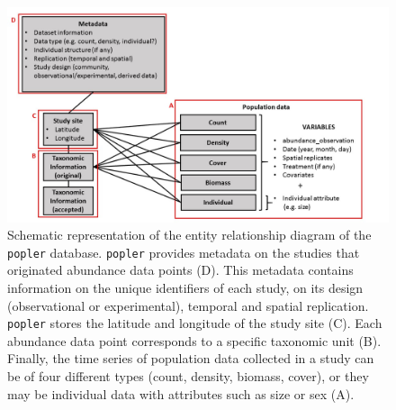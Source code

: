 \documentclass{article}\usepackage[]{graphicx}\usepackage[]{color}
\begin{document}
\newpage
\begin{figure}[h!]
  \begin{center}
    \includegraphics[scale=0.4]{schema}
    \caption{Schematic representation of the entity relationship diagram of the \texttt{popler} database. \texttt{popler} provides metadata on the studies that originated abundance data points (D). This metadata contains information on the unique identifiers of each study, on its design (observational or experimental), temporal and spatial replication. \texttt{popler} stores the latitude and longitude of the study site (C). Each abundance data point corresponds to a specific taxonomic unit (B). Finally, the time series of population data collected in a study can be of four different types (count, density, biomass, cover), or they may be individual data with attributes such as size or sex (A).}
    \label{Fig:schema}
  \end{center}
\end{figure}
\end{document}
